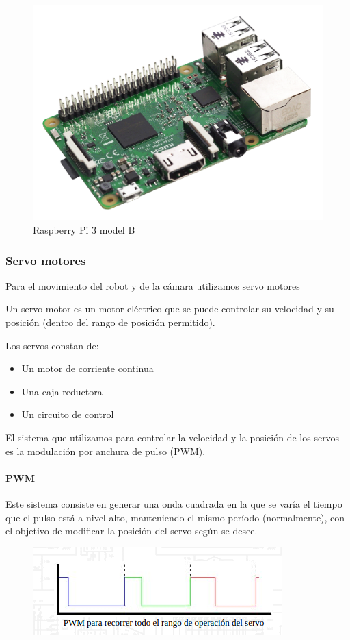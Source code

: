 \documentclass[twoside, 12pt]{epstfg}
\begin{document}
\begin{figure}[h]
	\centerline{
		\mbox{\includegraphics[width=.80\textwidth]{images/raspi3.jpg}}
	}
	\caption{Raspberry Pi 3 model B}
	
\end{figure}

\subsubsection{Servo motores}
Para el movimiento del robot y de la cámara utilizamos servo motores


Un servo motor es un motor eléctrico que se puede controlar su velocidad y su posición (dentro del rango de posición permitido).

Los servos constan de:
\begin{itemize}
	\item Un motor de corriente continua
	\item Una caja reductora
	\item Un circuito de control
\end{itemize}

El sistema que utilizamos para controlar la velocidad y la posición de los servos es la modulación por anchura de pulso (PWM).

\paragraph{PWM}

Este sistema consiste en generar una onda cuadrada en la que se varía el tiempo que el pulso está a nivel alto, manteniendo el mismo período (normalmente), con el objetivo de modificar la posición del servo según se desee.

\begin{figure}[h]
	\centerline{
		\mbox{\includegraphics[width=.80\textwidth]{images/ondaServo.png}}
	}
	
\end{figure}
\end{document}
